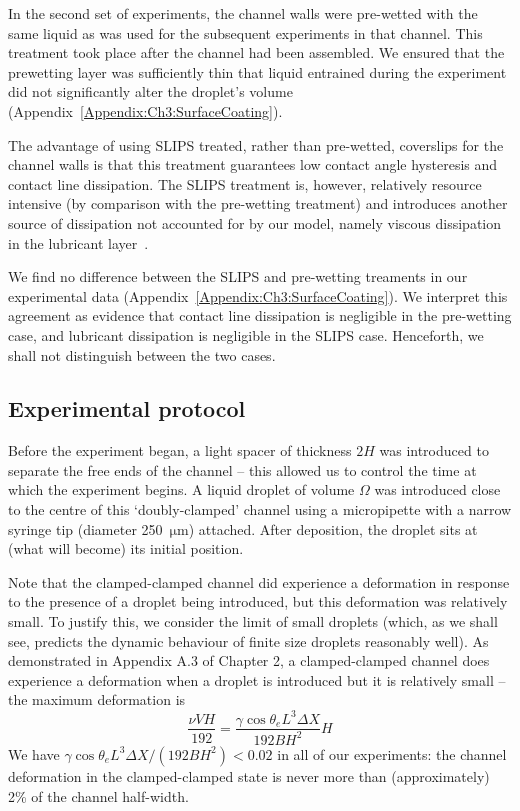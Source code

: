 In the second set of experiments, the channel walls were pre-wetted with the same liquid as was used for the subsequent experiments in that channel. This treatment took place after the channel had been assembled. We ensured that the prewetting layer was sufficiently thin that liquid entrained during the experiment did not significantly alter the droplet's volume (Appendix~\ref{Appendix:Ch3:SurfaceCoating}).

The advantage of using SLIPS treated, rather than pre-wetted, coverslips for the channel walls is that this treatment guarantees low contact angle hysteresis and contact line dissipation.  The SLIPS treatment is, however, relatively resource intensive (by comparison with the pre-wetting treatment) and introduces another source of dissipation not accounted for by our model, namely viscous dissipation in the lubricant layer~\citep{Keiser2017SoftMatter}.

We find no difference between the SLIPS and pre-wetting treaments in our experimental data (Appendix~\ref{Appendix:Ch3:SurfaceCoating}). We interpret this agreement as evidence that contact line dissipation is negligible in the pre-wetting case, and lubricant dissipation is negligible in the SLIPS case. Henceforth, we shall not distinguish between the two cases.

\subsection{Experimental protocol}\label{S:Ch3:ExperimentalSetup:Performing}
Before the experiment began, a light spacer of thickness $2H$ was introduced to separate the free ends of the channel -- this allowed us to control the time at which the experiment begins. A liquid droplet of volume $\Omega$ was introduced close to the centre of this `doubly-clamped' channel using a micropipette with a narrow syringe tip (diameter 250~$\si{\micro}$m) attached. After deposition, the droplet sits at (what will become) its initial position.

Note that the clamped-clamped channel did experience a deformation in response to the presence of a droplet being introduced, but this deformation was relatively small. To justify this, we consider the limit of small droplets (which, as we shall see, predicts the dynamic behaviour of finite size droplets reasonably well). As demonstrated in Appendix A.3 of Chapter 2, a clamped-clamped channel does experience a deformation when a droplet is introduced but it is relatively small -- the maximum deformation is
\begin{equation}
\frac{\nu V H}{192} = \frac{\gamma \cos \theta_e L^3  \Delta X}{192 B H^2} H
\end{equation}
We have $\gamma \cos \theta_e L^3 \Delta X/(192 B H^2) < 0.02$ in all of our experiments: the channel deformation in the clamped-clamped state is never more than (approximately) 2\% of the channel half-width.

